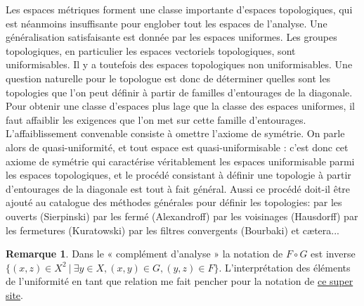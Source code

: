 \documentclass[a4paper, 11pt, french]{book}
\theoremstyle{plain} %
\theoremstyle{definition} %
\newtheorem{remarque}{Remarque}
\theoremstyle{remark} %
\newcommand{\1}{\mathds{1}}
\newcommand\ens[2]{\{#1 \ |\ #2\}}
\begin{document}
Les espaces métriques forment une classe importante d'espaces topologiques, qui est néanmoins insuffisante pour englober tout les espaces de l'analyse.
Une généralisation satisfaisante est donnée par les espaces uniformes.
Les groupes topologiques, en particulier les espaces vectoriels topologiques, sont uniformisables.
Il y a toutefois des espaces topologiques non uniformisables.
Une question naturelle pour le topologue est donc de déterminer quelles sont les topologies que l'on peut définir à partir de familles d'entourages de la diagonale.
Pour obtenir une classe d'espaces plus lage que la classe des espaces uniformes, il faut affaiblir les exigences que l'on met sur cette famille d'entourages.
L'affaiblissement convenable consiste à omettre l'axiome de symétrie.
On parle alors de quasi-uniformité, et tout espace est quasi-uniformisable : c'est donc cet axiome de symétrie qui caractérise véritablement les espaces uniformisable parmi les espaces topologiques, et le procédé consistant à définir une topologie à partir d'entourages de la diagonale est tout à fait général.
Aussi ce procédé doit-il être ajouté au catalogue des méthodes générales pour définir les topologies: par les ouverts (Sierpinski) par les fermé (Alexandroff) par les voisinages (Hausdorff) par les fermetures (Kuratowski) par les filtres convergents (Bourbaki) et cætera...

\begin{remarque}
	Dans le « complément d'analyse » la notation de $F\circ G$ est inverse $\ens{(x, z)\in X^2}{\exists y\in X, (x, y)\in G, (y, z)\in F}$.
	L'interprétation des éléments de l'uniformité en tant que relation me fait pencher pour la notation de \href{https://projects.lsv.ens-paris-saclay.fr/topology/?page_id=2869}{ce super site}.
\end{remarque}
\end{document}
